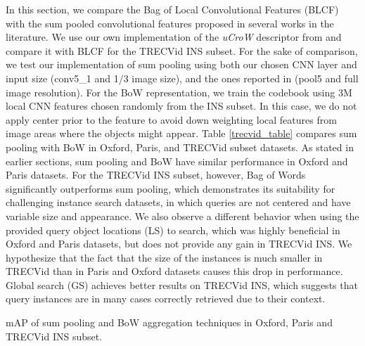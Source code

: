 \documentclass{sig-arxiv}
\begin{document}
In this section, we compare the Bag of Local Convolutional Features (BLCF) with the sum pooled convolutional features proposed in several works in the literature. We use our own implementation of the \emph{uCroW} descriptor from \cite{kalantidis2015} and compare it with BLCF for the TRECVid INS subset. For the sake of comparison, we test our implementation of sum pooling using both our chosen CNN layer and input size (conv5\_1 and 1/3 image size), and the ones reported in \cite{kalantidis2015} (pool5 and full image resolution). For the BoW representation, we train the codebook using 3M local CNN features chosen randomly from the INS subset. In this case, we do not apply center prior to the feature to avoid down weighting local features from image areas where the objects might appear. Table \ref{trecvid_table} compares sum pooling with BoW in Oxford, Paris, and TRECVid subset datasets. As stated in earlier sections, sum pooling and BoW have similar performance in Oxford and Paris datasets. For the TRECVid INS subset, however, Bag of Words significantly outperforms sum pooling, which demonstrates its suitability for challenging instance search datasets, in which queries are not centered and have variable size and appearance.  We also observe a different behavior when using the provided query object locations (LS) to search, which was highly beneficial in Oxford and Paris datasets, but does not provide any gain in TRECVid INS. We hypothesize that the fact that the size of the instances is much smaller in TRECVid than in Paris and Oxford datasets causes this drop in performance. Global search (GS) achieves better results on TRECVid INS, which suggests that query instances are in many cases correctly retrieved due to their context. 

\centering
\caption{mAP of sum pooling and BoW aggregation techniques in Oxford, Paris and TRECVid INS subset.}
\label{trecvid_table}
\end{document}
